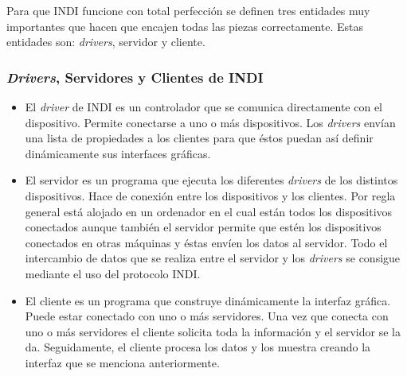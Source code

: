 Para que INDI funcione con total perfección se definen tres entidades muy importantes que hacen que encajen todas las piezas correctamente. Estas entidades son: \textit{drivers}, servidor y cliente.

\subsubsection{\textit{Drivers}, Servidores y Clientes de INDI}
\begin{itemize}
  \item El \textit{driver} de INDI es un controlador que se comunica directamente con el dispositivo. Permite conectarse a uno o más dispositivos. Los \textit{drivers} envían una lista de propiedades a los clientes para que éstos puedan así definir dinámicamente sus interfaces gráficas.
  \item El servidor es un programa que ejecuta los diferentes \textit{drivers} de los distintos dispositivos. Hace de conexión entre los dispositivos y los clientes. Por regla general está alojado en un ordenador en el cual están todos los dispositivos conectados aunque también el servidor permite que estén los dispositivos conectados en otras máquinas y éstas envíen los datos al servidor.
 Todo el intercambio de datos que se realiza entre el servidor y los \textit{drivers} se consigue mediante el uso del protocolo INDI.
  \item El cliente es un programa que construye dinámicamente la interfaz gráfica. Puede estar conectado con uno o más servidores. Una vez que conecta con uno o más servidores el cliente solicita toda la información y el servidor se la da. Seguidamente, el cliente procesa los datos y los muestra creando la interfaz que se menciona anteriormente.
\end{itemize}

